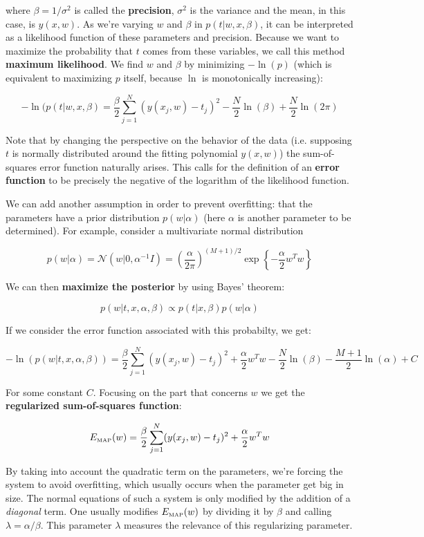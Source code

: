 where $\beta = 1/\sigma^2$ is called the \textbf{precision}, $\sigma^2$ is the variance and the mean, in this case, is $y(x,w)$. As we're varying $w$ and $\beta$ in $p(t|w,x,\beta)$, it can be interpreted as a likelihood function of these parameters and precision. Because we want to maximize the probability that $t$ comes from these variables, we call this method \textbf{maximum likelihood}. We find $w$ and $\beta$ by minimizing $-\ln(p)$ (which is equivalent to maximizing $p$ itself, because $\ln$ is monotonically increasing):

\[-\ln(p(t|w,x,\beta) = \frac{\beta}{2}\sum_{j=1}^N(y(x_j, w) - t_j)^2 - \frac{N}{2}\ln(\beta) + \frac{N}{2}\ln(2\pi) \]

Note that by changing the perspective on the behavior of the data (i.e. supposing $t$ is normally distributed around the fitting polynomial $y(x,w)$) the sum-of-squares error function naturally arises. This calls for the definition of an \textbf{error function} to be precisely the negative of the logarithm of the likelihood function.

We can add another assumption in order to prevent overfitting: that the parameters have a prior distribution $p(w|\alpha)$ (here $\alpha$ is another parameter to be determined). For example, consider a multivariate normal distribution

\[p(w|\alpha) = \mathcal{N}(w|0, \alpha^{-1}I) = \left(\frac{\alpha}{2\pi}\right)^{(M+1)/2}\exp\left\{-\frac{\alpha}{2}w^Tw\right\}\]

We can then \textbf{maximize the posterior} by using Bayes' theorem:

\[p(w|t, x, \alpha, \beta) \propto p(t|x,\beta)p(w|\alpha)\]

If we consider the error function associated with this probabilty, we get: 

\[-\ln(p(w|t,x,\alpha,\beta)) = \frac{\beta}{2}\sum_{j=1}^N(y(x_j, w) - t_j)^2 + \frac{\alpha}{2}w^Tw - \frac{N}{2}\ln(\beta) - \frac{M+1}{2}\ln(\alpha) + C\]

For some constant $C$. Focusing on the part that concerns $w$ we get the \textbf{regularized sum-of-squares function}:

\[E_{\tiny\mbox{MAP}}(w) = \frac{\beta}{2}\sum_{j=1}^N(y(x_j, w) - t_j)^2 + \frac{\alpha}{2}w^Tw\]

By taking into account the quadratic term on the parameters, we're forcing the system to avoid overfitting, which usually occurs when the parameter get big in size. The normal equations of such a system is only modified by the addition of a \textit{diagonal} term. One usually modifies $E_{\tiny\mbox{MAP}}(w)$ by dividing it by $\beta$ and calling $\lambda = \alpha/\beta$. This parameter $\lambda$ measures the relevance of this regularizing parameter.

